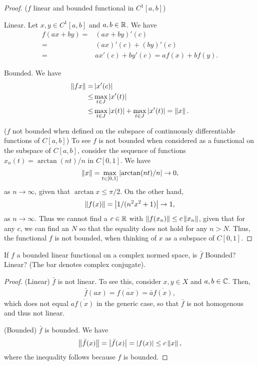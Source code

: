 \begin{proof}
($f$ linear and bounded functional in $C^1[a,b]$)

Linear.
Let $x,y\in C^1[a,b]$ and $a,b\in\mathbb{R}$.
We have 
\begin{align*}
f(ax+by) 
=& (ax+by)'(c)\\
=& (ax)'(c)+(by)'(c)\\
=& ax'(c)+by'(c) =af(x)+bf(y).
\end{align*}


Bounded.
We have 
\begin{align*}
\left\lVert fx\right\rVert 
=& \left\lvert x'(c)\right\rvert\\
\leq& \max_{t\in J}\left\lvert x'(t)\right\rvert\\
\leq& \max_{t\in J}\left\lvert x(t)\right\rvert + \max_{t\in J}\left\lvert x'(t)\right\rvert =\left\lVert x\right\rVert.
\end{align*}

($f$ not bounded when defined on the subspace of continuously differentiable functions of $C[a,b]$)
To see $f$ is not bounded when considered as a functional on the subspace of $C[a,b]$, consider the sequence of functions $x_n(t)=\arctan(nt)/n$ in $C[0,1]$.
We have
\begin{align*}
    \left\lVert x\right\rVert
    = \max_{t\in[0,1]}\left\lvert \arctan(nt)/n\right\rvert \to 0,
\end{align*}
as $n\to\infty$, given that $\arctan{x}\leq\pi/2$.
On the other hand,
\begin{align*}
    \left\lVert f(x)\right\rVert
    = \left\lvert 1/(n^2x^2+1)\right\rvert \to 1,
\end{align*}
as $n\to\infty$.
Thus we cannot find a $c\in\mathbb{R}$ with $\left\lVert f(x_n)\right\rVert\leq c\left\lVert x_n\right\rVert$, given that for any $c$, we can find an $N$ so that the equality does not hold for any $n>N$.
Thus, the functional $f$ is not bounded, when thinking of $x$ as a subspace of $C[0,1]$.
\end{proof}

\begin{exercise}{7}
If $f$ a bounded linear functional on a complex normed space, is $\bar{f}$ Bounded? Linear?
(The bar denotes complex conjugate).
\end{exercise}
\begin{proof}
(Linear)
$\bar{f}$ is not linear. 
To see this, consider $x,y\in X$ and $a,b\in\mathbb{C}$.
Then, 
\begin{align*}
    \bar{f}(ax) 
    =\overline{f(ax)} 
    =\bar{a}\overline{f(x)},
\end{align*}
which does not equal $a\overline{f(x)}$ in the generic case, so that $\bar{f}$ is not homogenous and thus not linear.

(Bounded)
$\bar{f}$ is bounded.
We have
\begin{align*}
\left\lVert \bar{f}(x)\right\rVert
= \left\lvert \bar{f}(x)\right\rvert
= \left\lvert f(x)\right\rvert
\leq c\left\lVert x\right\rVert,
\end{align*}
where the inequality follows because $f$ is bounded.
\end{proof}

